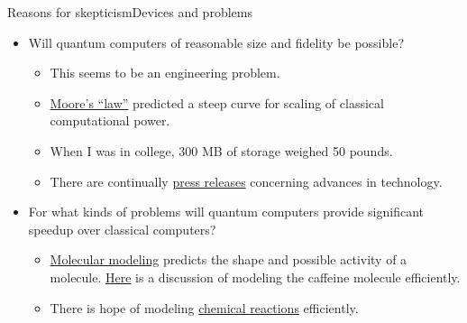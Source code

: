 \begin{frame}{Reasons for skepticism}{Devices and problems}

\begin{itemize}[<+->]
    \item Will quantum computers of reasonable size and fidelity be possible?
    \begin{itemize}
        \item This seems to be an engineering problem.
        \item \href{https://en.wikipedia.org/wiki/Moore's_law}{Moore's ``law''} predicted a steep curve for scaling of classical computational power.
        \item When I was in college, 300 MB of storage weighed 50 pounds.
        \item There are continually \href{https://www.google.com/search?q=quantum+computing+advances&rlz=1C5CHFA_enUS706US706&oq=quantum+computing+advances&ie=UTF-8}{press releases} concerning advances in technology.
    \end{itemize}
    \item For what kinds of problems will quantum computers provide significant speedup over classical computers?
    \begin{itemize}
        \item  \href{https://en.wikipedia.org/wiki/Molecular_modelling}{Molecular modeling} predicts the shape and possible activity of a molecule.  \href{https://venturebeat.com/2019/07/14/ibm-research-explains-how-quantum-computing-works-and-could-be-the-the-supercomputer-of-the-future/}{Here} is a discussion of modeling the caffeine molecule efficiently.
        \item There is hope of modeling \href{https://www.newscientist.com/article/2253089-google-performed-the-first-quantum-simulation-of-a-chemical-reaction/}{chemical reactions} efficiently.
    \end{itemize}
\end{itemize}
    
\end{frame}


